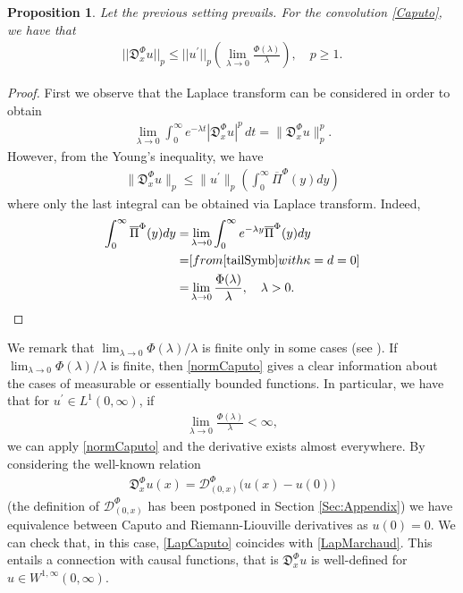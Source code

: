 \documentclass[11pt,a4paper]{article}
\theoremstyle{plain}
\newtheorem{proposition}[theorem]{Proposition}
\theoremstyle{definition}
\theoremstyle{remark}
\begin{document}
	\begin{proposition}
		Let the previous setting prevails. For the convolution \eqref{Caputo}, we have that 
		\begin{align}
			\label{normCaputo}
			\vert \vert \mathfrak{D}_{x}^\Phi u \vert \vert_p \leq \vert\vert u^\prime \vert \vert_p \left(\lim_{\lambda \to 0} \frac{\Phi(\lambda)}{\lambda}\right), \quad p \geq 1.
		\end{align}
	\end{proposition}
	\begin{proof}
		First we observe that the Laplace transform can be considered in order to obtain 
		\begin{align*}
			\lim_{\lambda \to 0} \int_0^\infty e^{-\lambda t} |\mathfrak{D}_{x}^\Phi u|^p\, dt = \| \mathfrak{D}_{x}^\Phi u \|_p^p.
		\end{align*}
		However, from the Young's inequality, we have
		\begin{align*}
			\| \mathfrak{D}_{x}^\Phi u \|_p \leq \| u^\prime \|_p \left( \int_0^\infty \overline{\Pi}^\Phi (y) dy \right)
		\end{align*}
		where only the last integral can be obtained via Laplace transform. Indeed,
		\begin{align*}
			\int_0^\infty \overline{\Pi}^\Phi (y) dy 
			= & \lim_{\lambda \to 0} \int_0^\infty e^{-\lambda y} \overline{\Pi}^\Phi (y) dy\\ 
			= & [\textrm{from }\eqref{tailSymb}\textrm{ with }\kappa=d=0 ]\\ 
			= & \lim_{\lambda \to 0} \frac{\Phi(\lambda)}{\lambda}, \quad \lambda>0.
		\end{align*}
	\end{proof}
	
	We remark that $\lim_{\lambda \to 0} \Phi(\lambda)/\lambda$ is finite only in some cases (see \cite{capitanelli2019fractional}). If $\lim_{\lambda \to 0} \Phi(\lambda)/\lambda$ is finite, then \eqref{normCaputo} gives a clear information about the cases of measurable or essentially bounded functions. In particular, we have that for $u^\prime \in L^1(0,\infty)$, if 
	\begin{align*}
		\lim_{\lambda \to 0} \frac{\Phi(\lambda)}{\lambda} < \infty,
	\end{align*}
	we can apply \eqref{normCaputo} and the derivative exists almost everywhere. By considering the well-known relation 
	\begin{align*}
		\mathfrak{D}_x^\Phi u(x)= \mathcal{D}_{(0,x)}^\Phi \big(u(x) - u(0) \big)
	\end{align*}
	(the definition of $\mathcal{D}_{(0,x)}^\Phi$ has been postponed in Section \ref{Sec:Appendix}) we have equivalence between Caputo and Riemann-Liouville derivatives as $u(0)=0$. We can check that, in this case, \eqref{LapCaputo} coincides with \eqref{LapMarchaud}. This entails a connection with causal functions, that is $\mathfrak{D}^\Phi_x u$ is well-defined for $u \in W^{1, \infty}(0, \infty)$.\\
	
\end{document}
